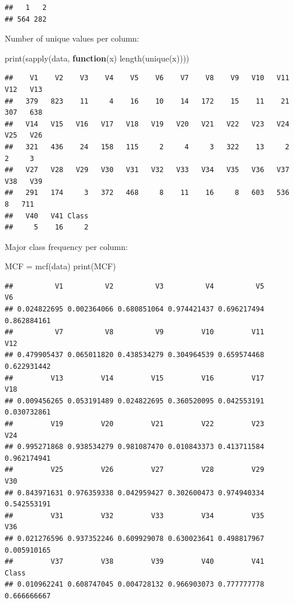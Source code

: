 \documentclass[
]{article}
\newenvironment{Shaded}{\begin{snugshade}}{\end{snugshade}}
\newcommand{\ControlFlowTok}[1]{\textcolor[rgb]{0.13,0.29,0.53}{\textbf{#1}}}
\newcommand{\FunctionTok}[1]{\textcolor[rgb]{0.00,0.00,0.00}{#1}}
\newcommand{\NormalTok}[1]{#1}
\newcommand{\OtherTok}[1]{\textcolor[rgb]{0.56,0.35,0.01}{#1}}
\begin{document}
\begin{verbatim}
##   1   2 
## 564 282
\end{verbatim}

Number of unique values per column:

\begin{Shaded}
\begin{Highlighting}[]
\FunctionTok{print}\NormalTok{(}\FunctionTok{sapply}\NormalTok{(data, }\ControlFlowTok{function}\NormalTok{(x) }\FunctionTok{length}\NormalTok{(}\FunctionTok{unique}\NormalTok{(x))))}
\end{Highlighting}
\end{Shaded}

\begin{verbatim}
##    V1    V2    V3    V4    V5    V6    V7    V8    V9   V10   V11   V12   V13 
##   379   823    11     4    16    10    14   172    15    11    21   307   638 
##   V14   V15   V16   V17   V18   V19   V20   V21   V22   V23   V24   V25   V26 
##   321   436    24   158   115     2     4     3   322    13     2     2     3 
##   V27   V28   V29   V30   V31   V32   V33   V34   V35   V36   V37   V38   V39 
##   291   174     3   372   468     8    11    16     8   603   536     8   711 
##   V40   V41 Class 
##     5    16     2
\end{verbatim}

Major class frequency per column:

\begin{Shaded}
\begin{Highlighting}[]
\NormalTok{MCF }\OtherTok{=} \FunctionTok{mcf}\NormalTok{(data)}
\FunctionTok{print}\NormalTok{(MCF)}
\end{Highlighting}
\end{Shaded}

\begin{verbatim}
##          V1          V2          V3          V4          V5          V6 
## 0.024822695 0.002364066 0.680851064 0.974421437 0.696217494 0.862884161 
##          V7          V8          V9         V10         V11         V12 
## 0.479905437 0.065011820 0.438534279 0.304964539 0.659574468 0.622931442 
##         V13         V14         V15         V16         V17         V18 
## 0.009456265 0.053191489 0.024822695 0.360520095 0.042553191 0.030732861 
##         V19         V20         V21         V22         V23         V24 
## 0.995271868 0.938534279 0.981087470 0.010843373 0.413711584 0.962174941 
##         V25         V26         V27         V28         V29         V30 
## 0.843971631 0.976359338 0.042959427 0.302600473 0.974940334 0.542553191 
##         V31         V32         V33         V34         V35         V36 
## 0.021276596 0.937352246 0.609929078 0.630023641 0.498817967 0.005910165 
##         V37         V38         V39         V40         V41       Class 
## 0.010962241 0.608747045 0.004728132 0.966903073 0.777777778 0.666666667
\end{verbatim}
\end{document}
